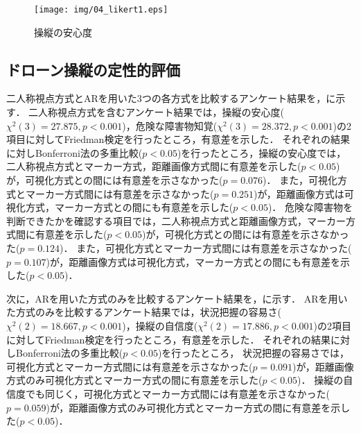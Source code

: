 \documentclass[submit, sigrecommended]{ipsj}
\begin{document}

\begin{figure}[tb]
  \centering
  \texttt{[image: img/04\_likert1.eps]}
  \caption{操縦の安心度}
  \label{fig:04_likert1}
  \end{figure}
  

\subsection{ドローン操縦の定性的評価}
\label{result_2}
二人称視点方式とARを用いた3つの各方式を比較するアンケート結果を，に示す．
二人称視点方式を含むアンケート結果では，操縦の安心度($\chi^{2}(3)=27.875, p < 0.001$)，危険な障害物知覚($\chi^{2}(3)=28.372, p < 0.001$)の2項目に対してFriedman検定を行ったところ，有意差を示した．
それぞれの結果に対しBonferroni法の多重比較($p < 0.05$)を行ったところ，操縦の安心度では，二人称視点方式とマーカー方式，距離画像方式間に有意差を示した($p < 0.05$)が，可視化方式との間には有意差を示さなかった($p = 0.076$)．
また，可視化方式とマーカー方式間には有意差を示さなかった($p = 0.251$)が，距離画像方式は可視化方式，マーカー方式との間にも有意差を示した($p < 0.05$)．
危険な障害物を判断できたかを確認する項目では，二人称視点方式と距離画像方式，マーカー方式間に有意差を示した($p < 0.05$)が，可視化方式との間には有意差を示さなかった($p = 0.124$)．
また，可視化方式とマーカー方式間には有意差を示さなかった($p = 0.107$)が，距離画像方式は可視化方式，マーカー方式との間にも有意差を示した($p < 0.05$)．
\par
次に，ARを用いた方式のみを比較するアンケート結果を，に示す．
ARを用いた方式のみを比較するアンケート結果では，状況把握の容易さ($\chi^{2}(2)=18.667, p < 0.001$)，操縦の自信度($\chi^{2}(2)=17.886, p < 0.001$)の2項目に対してFriedman検定を行ったところ，有意差を示した．
それぞれの結果に対しBonferroni法の多重比較($p < 0.05$)を行ったところ，
状況把握の容易さでは，可視化方式とマーカー方式間には有意差を示さなかった($p = 0.091$)が，距離画像方式のみ可視化方式とマーカー方式の間に有意差を示した($p < 0.05$)．
操縦の自信度でも同じく，可視化方式とマーカー方式間には有意差を示さなかった($p = 0.059$)が，距離画像方式のみ可視化方式とマーカー方式の間に有意差を示した($p < 0.05$)．

\end{document}
